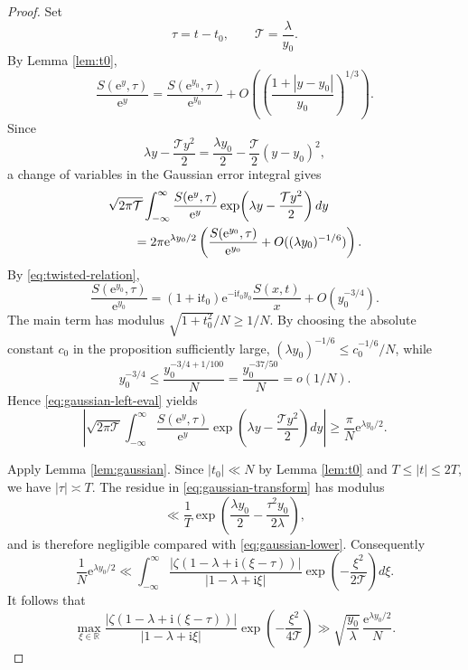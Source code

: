 \documentclass[12pt,reqno]{amsart}
\theoremstyle{remark}
\numberwithin{equation}{section}
\newcommand{\R}{\mathbb R}
\newcommand{\e}{\mathrm e}
\newcommand{\ii}{\mathrm i}
\begin{document}
\begin{proof}
Set
\[
\tau=t-t_0,
\qquad
\mathcal T=\frac{\lambda}{y_0}.
\]
By Lemma \ref{lem:t0},
\[
\frac{S(\e^y,\tau)}{\e^y}
=
\frac{S(\e^{y_0},\tau)}{\e^{y_0}}
+O\!\left(\left(\frac{1+|y-y_0|}{y_0}\right)^{1/3}\right).
\]
Since
\[
\lambda y-\frac{\mathcal T y^2}{2}
=
\frac{\lambda y_0}{2}-\frac{\mathcal T}{2}(y-y_0)^2,
\]
a change of variables in the Gaussian error integral gives
\begin{align}
&\sqrt{2\pi\mathcal T}
\int_{-\infty}^{\infty}
\frac{S(\e^y,\tau)}{\e^y}
\exp\!\left(\lambda y-\frac{\mathcal T y^2}{2}\right)dy \notag\\
&\qquad=
2\pi\e^{\lambda y_0/2}
\left(
\frac{S(\e^{y_0},\tau)}{\e^{y_0}}
+O((\lambda y_0)^{-1/6})
\right).
\label{eq:gaussian-left-eval}
\end{align}
By \eqref{eq:twisted-relation},
\[
\frac{S(\e^{y_0},\tau)}{\e^{y_0}}
=(1+\ii t_0)\e^{-\ii t_0y_0}\frac{S(x,t)}x
+O(y_0^{-3/4}).
\]
The main term has modulus $\sqrt{1+t_0^2}/N\ge1/N$.  By choosing the absolute constant $c_0$ in the proposition sufficiently large, $(\lambda y_0)^{-1/6}\le c_0^{-1/6}/N$, while
\[
y_0^{-3/4}\le \frac{y_0^{-3/4+1/100}}{N}=\frac{y_0^{-37/50}}{N}=o(1/N).
\]  Hence \eqref{eq:gaussian-left-eval} yields
\begin{equation}\label{eq:gaussian-lower}
\left|
\sqrt{2\pi\mathcal T}
\int_{-\infty}^{\infty}
\frac{S(\e^y,\tau)}{\e^y}
\exp\!\left(\lambda y-\frac{\mathcal T y^2}{2}\right)dy
\right|
\ge\frac{\pi}{N}\e^{\lambda y_0/2}.
\end{equation}

Apply Lemma \ref{lem:gaussian}.  Since $|t_0|\ll N$ by Lemma \ref{lem:t0} and $T\le|t|\le2T$, we have $|\tau|\asymp T$.  The residue in \eqref{eq:gaussian-transform} has modulus
\begin{equation}\label{eq:residue-small}
\ll \frac1T
\exp\!\left(
\frac{\lambda y_0}{2}-\frac{\tau^2y_0}{2\lambda}
\right),
\end{equation}
and is therefore negligible compared with \eqref{eq:gaussian-lower}.  Consequently
\begin{equation}\label{eq:zeta-integral-lower}
\frac1N\e^{\lambda y_0/2}
\ll
\int_{-\infty}^{\infty}
\frac{|\zeta(1-\lambda+\ii(\xi-\tau))|}{|1-\lambda+\ii\xi|}
\exp\!\left(-\frac{\xi^2}{2\mathcal T}\right)d\xi.
\end{equation}
It follows that
\begin{equation}\label{eq:weighted-maximum}
\max_{\xi\in\R}
\frac{|\zeta(1-\lambda+\ii(\xi-\tau))|}{|1-\lambda+\ii\xi|}
\exp\!\left(-\frac{\xi^2}{4\mathcal T}\right)
\gg
\sqrt{\frac{y_0}{\lambda}}\,
\frac{\e^{\lambda y_0/2}}N.
\end{equation}


\end{proof}
\end{document}
